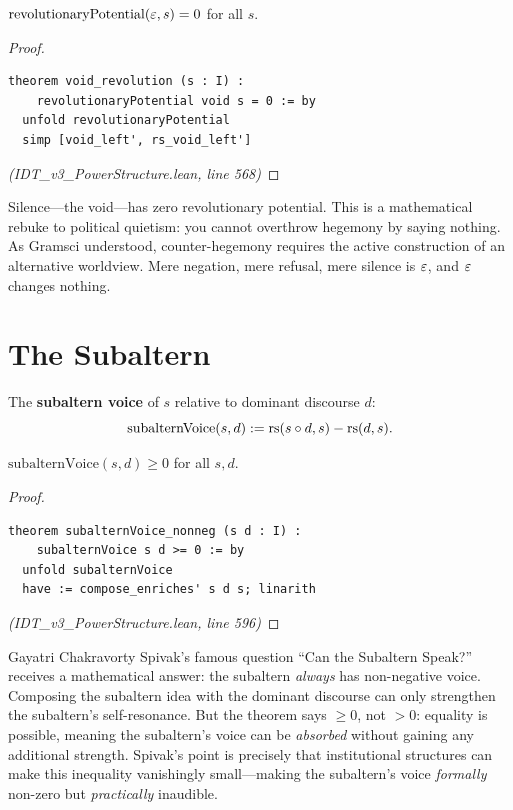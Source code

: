 \begin{theorem}
\label{thm:void-revolution}
$\mathrm{revolutionaryPotential}(\varepsilon, s) = 0$ for all $s$.
\end{theorem}

\begin{proof}
\begin{lstlisting}
theorem void_revolution (s : I) :
    revolutionaryPotential void s = 0 := by
  unfold revolutionaryPotential
  simp [void_left', rs_void_left']
\end{lstlisting}
\textit{(IDT\_v3\_PowerStructure.lean, line 568)}
\end{proof}

\begin{interpretation}
Silence---the void---has zero revolutionary potential. This is a mathematical
rebuke to political quietism: you cannot overthrow hegemony by saying nothing.
As Gramsci understood, counter-hegemony requires the active construction of
an alternative worldview. Mere negation, mere refusal, mere silence is
$\varepsilon$, and $\varepsilon$ changes nothing.
\end{interpretation}

\section{The Subaltern}

\begin{definition}
\label{def:subaltern}
The \textbf{subaltern voice} of $s$ relative to dominant discourse $d$:
\[
  \mathrm{subalternVoice}(s, d) := \mathrm{rs}(s \circ d, s) - \mathrm{rs}(d, s).
\]
\end{definition}

\begin{theorem}
\label{thm:subaltern-nonneg}
$\mathrm{subalternVoice}(s, d) \geq 0$ for all $s, d$.
\end{theorem}

\begin{proof}
\begin{lstlisting}
theorem subalternVoice_nonneg (s d : I) :
    subalternVoice s d >= 0 := by
  unfold subalternVoice
  have := compose_enriches' s d s; linarith
\end{lstlisting}
\textit{(IDT\_v3\_PowerStructure.lean, line 596)}
\end{proof}

\begin{interpretation}
Gayatri Chakravorty Spivak's famous question ``Can the Subaltern Speak?''
receives a mathematical answer: the subaltern \emph{always} has non-negative
voice. Composing the subaltern idea with the dominant discourse can only
strengthen the subaltern's self-resonance. But the theorem says $\geq 0$, not
$> 0$: equality is possible, meaning the subaltern's voice can be \emph{absorbed}
without gaining any additional strength. Spivak's point is precisely that
institutional structures can make this inequality vanishingly small---making
the subaltern's voice \emph{formally} non-zero but \emph{practically} inaudible.
\end{interpretation}


